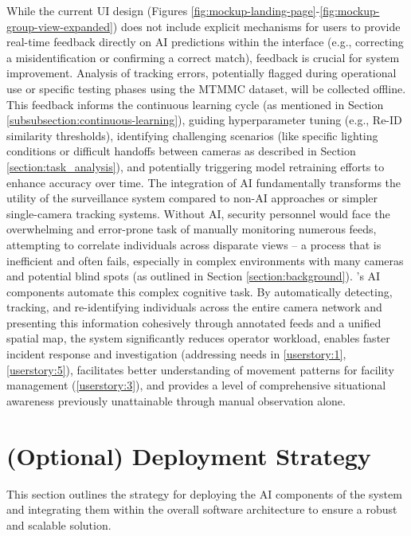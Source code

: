 While the current UI design (Figures \ref{fig:mockup-landing-page}-\ref{fig:mockup-group-view-expanded}) does not include explicit mechanisms for users to provide real-time feedback directly on AI predictions within the interface (e.g., correcting a misidentification or confirming a correct match), feedback is crucial for system improvement. Analysis of tracking errors, potentially flagged during operational use or specific testing phases using the MTMMC dataset, will be collected offline. This feedback informs the continuous learning cycle (as mentioned in Section \ref{subsubsection:continuous-learning}), guiding hyperparameter tuning (e.g., Re-ID similarity thresholds), identifying challenging scenarios (like specific lighting conditions or difficult handoffs between cameras as described in Section \ref{section:task_analysis}), and potentially triggering model retraining efforts to enhance accuracy over time. %
The integration of AI fundamentally transforms the utility of the surveillance system compared to non-AI approaches or simpler single-camera tracking systems. Without AI, security personnel would face the overwhelming and error-prone task of manually monitoring numerous feeds, attempting to correlate individuals across disparate views – a process that is inefficient and often fails, especially in complex environments with many cameras and potential blind spots (as outlined in Section \ref{section:background}). \usevar{\srsTitle}'s AI components automate this complex cognitive task. By automatically detecting, tracking, and re-identifying individuals across the entire camera network and presenting this information cohesively through annotated feeds and a unified spatial map, the system significantly reduces operator workload, enables faster incident response and investigation (addressing needs in \ref{userstory:1}, \ref{userstory:5}), facilitates better understanding of movement patterns for facility management (\ref{userstory:3}), and provides a level of comprehensive situational awareness previously unattainable through manual observation alone. %

\section{(Optional) Deployment Strategy}
\label{section:deployment} %
This section outlines the strategy for deploying the AI components of the \usevar{\srsTitle} system and integrating them within the overall software architecture to ensure a robust and scalable solution.

